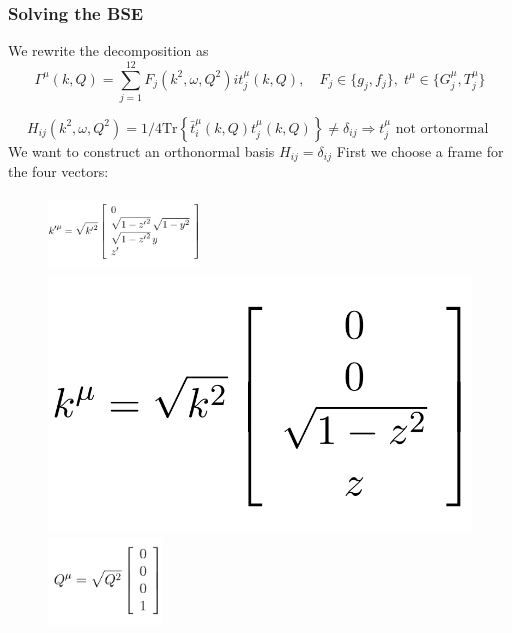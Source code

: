 \begin{frame}
    \frametitle{Solving the BSE}
    We rewrite the decomposition as
    \small\begin{equation}\label{eq:7}
              \!\!\!\!\!\!\!    \Gamma^\mu(k, Q)=\sum_{j=1}^{12} F_j(k^2, \omega, Q^2)it^\mu_j(k,Q), \quad F_j\in\{g_j,f_j\}, \; t^\mu\in\{G^\mu_j, T^\mu_j\}
    \end{equation}

    $$\!\!\!\!\!\!\!\!\!H_{ij}(k^2, \omega, Q^2)=1/4\mbox{Tr}\left\{\bar{t}^\mu_i(k,Q)t^\mu_j(k,Q)\right\}\neq\delta_{ij}\Longrightarrow t^\mu_j  \mbox{ not ortonormal }$$
    We want to construct an orthonormal basis $H_{ij}=\delta_{ij}$
    First we choose a frame for the four vectors:
    \begin{figure}[!htb]
        \hspace{-7mm}
        \includegraphics[width=4cm, height=2cm]{graphics/kps}

        \endminipage\hfill
        \includegraphics[width=\linewidth]{graphics/ks}

        \endminipage\hfill
        \includegraphics[width=\linewidth,  height=2.3cm]{graphics/Qs}

        \label{fig:qkkp}
        \endminipage
    \end{figure}
\end{frame}

